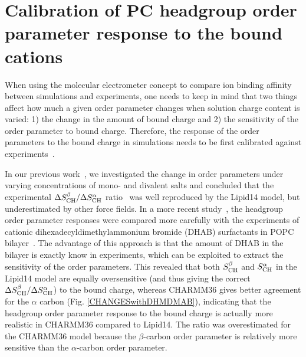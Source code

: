 \documentclass[journal=jpcbfk]{achemso}
\begin{document}
\pagebreak
\section{Calibration of PC headgroup order parameter response to the bound cations}\label{electrometerCALIBRATION}
When using the molecular electrometer concept to compare ion binding affinity between simulations
and experiments, one needs to keep in mind that two things affect how much a given order parameter changes when solution charge content is varied: 1) the change in the amount of bound charge and 2) the sensitivity of the order parameter to bound charge. Therefore, the response of the order parameters to the bound charge in simulations needs to be first calibrated
against experiments~\cite{catte16,melcr18}. 

In our previous work~\cite{catte16}, we investigated the change in order parameters under varying concentrations of mono- and divalent salts and concluded that the experimental $\Delta S_{\rm CH}^\beta / \Delta S_{\rm CH}^\alpha$ ratio~\cite{akutsu81} was well reproduced by the Lipid14 model, but underestimated by other force fields. In a more recent study~\cite{melcr18},
the headgroup order parameter responses were compared more carefully with the experiments of
cationic dihexadecyldimethylammonium bromide (DHAB) surfactants in POPC bilayer~\cite{scherer89}. The advantage of this approach is that the amount of DHAB in the bilayer is exactly know in experiments, which can be exploited to extract the sensitivity of the order parameters.
This revealed that both $S_{\rm CH}^\beta$ and $S_{\rm CH}^\alpha$ in the Lipid14 model are equally oversensitive (and thus giving the correct $\Delta S_{\rm CH}^\beta / \Delta S_{\rm CH}^\alpha$) to the bound charge,
whereas CHARMM36 gives better agreement for the $\alpha$ carbon (Fig. \ref{CHANGESwithDHMDMAB}), indicating that the headgroup order parameter response to the bound charge is actually more realistic
in CHARMM36 compared to Lipid14. The ratio was overestimated for the CHARMM36 model because the $\beta$-carbon order parameter
is relatively more sensitive than the $\alpha$-carbon order parameter. 
\end{document}
